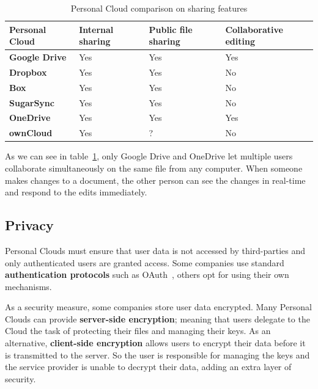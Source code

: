 {
\def\arraystretch{1.5}

\begin{table}
\begin{center}
    \begin{tabular}{ | p{3.3cm} | p{1.5cm} | p{2cm} | p{2.5cm} | }
    \hline
    \rowcolor[gray]{0.8}

	\textbf{Personal Cloud} &
	\textbf{Internal sharing} &
	\textbf{Public file sharing} &
	\textbf{Collaborative editing} \\ \hline

	\textbf{Google Drive} &
	Yes &
	Yes &
	Yes \\ \hline

	\textbf{Dropbox} &
	Yes &
	Yes &
	No \\ \hline
	
	\textbf{Box} &
	Yes &
	Yes &
	No \\ \hline
	
	\textbf{SugarSync} & 
	Yes &
	Yes &
	No \\ \hline
	
	\textbf{OneDrive} & 
	Yes &
	Yes &
	Yes \\ \hline
	
	\textbf{ownCloud} &
	Yes &
	? &
	No \\ \hline

    \end{tabular}
    \caption{Personal Cloud comparison on sharing features}
    \label{tab:pc_sharing}
\end{center}
\end{table}
}

As we can see in table~\ref{tab:pc_sharing}, only Google Drive and OneDrive let multiple users collaborate simultaneously on the same file from any computer. When someone makes changes to a document, the other person can see the changes in real-time and respond to the edits immediately.

\subsection{Privacy}


Personal Clouds must ensure that user data is not accessed by third-parties and only authenticated users are granted access. Some companies use standard \textbf{authentication protocols} such as OAuth~\cite{oauth}, others opt for using their own mechanisms.

As a security measure, some companies store user data encrypted. Many Personal Clouds can provide \textbf{server-side encryption}; meaning that users delegate to the Cloud the task of protecting their files and managing their keys. As an alternative, \textbf{client-side encryption} allows users to encrypt their data before it is transmitted to the server. So the user is responsible for managing the keys and the service provider is unable to decrypt their data, adding an extra layer of security.

